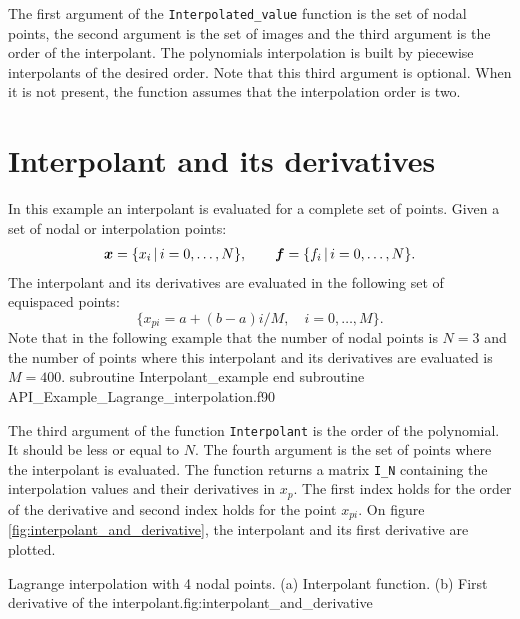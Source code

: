 The first argument of the \verb|Interpolated_value| function is the set of nodal points, the second argument is the set of images and the third argument is the order of the interpolant. The polynomials interpolation is built by piecewise interpolants 
of the desired order. 
Note that this third argument is optional. When it is not present, the function assumes that the interpolation order is two. 

\section{Interpolant and its derivatives} 
In this example an interpolant is evaluated for a complete set of points. 
Given a set of nodal or interpolation points: 
%
\begin{align*}
	\boldsymbol{x}=\{ x_i \, | \, i=0, \ldots, N     \},
	\qquad
	\boldsymbol{f}=\{ f_i \, | \, i=0, \ldots, N     \}.
\end{align*}
%
The interpolant and its derivatives are evaluated in the following set of equispaced points: 
$$
 \{  x_{pi} = a + {(b-a)i}/{M}, \quad   i=0, \ldots, M  \}.
$$ 
Note that in the following example that the number of nodal points is $ N = 3 $ 
and the number of points where this interpolant and its derivatives are evaluated is $ M = 400 $. 
\vspace{0.5cm} 
         {subroutine Interpolant_example}
         {end subroutine}
         {API_Example_Lagrange_interpolation.f90}


The third argument of the function \verb|Interpolant| is the order of the polynomial. It should be less or equal to $N$. 
The fourth argument is the set of points where the interpolant is evaluated. The function returns  a matrix \verb|I_N| containing the 
interpolation values and their  derivatives in $ x_p $. The first index holds for the order of the derivative and second index holds for the point $ x_{pi} $. 
On figure \ref{fig:interpolant_and_derivative}, the interpolant and its first derivative are plotted.  
 
          {Lagrange interpolation with 4 nodal points. (a) Interpolant function. (b) First derivative of the interpolant.}{fig:interpolant_and_derivative}
 


\FloatBarrier

